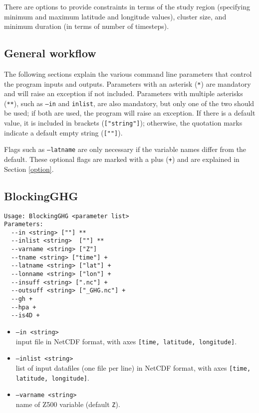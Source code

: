 \documentclass{article}
\begin{document}
There are options to provide constraints in terms of the study region (specifying minimum and maximum latitude and longitude values), cluster size, and minimum duration (in terms of number of timesteps).

\subsection{General workflow}

The following sections explain the various command line parameters that control the program inputs and outputs. Parameters with an asterisk (\texttt{*}) are mandatory and will raise an exception if not included. Parameters with multiple asterisks (\texttt{**}), such as \texttt{--in} and \texttt{inlist}, are also mandatory, but only one of the two should be used; if both are used, the program will raise an exception. If there is a default value, it is included in brackets (\texttt{["string"]}); otherwise, the quotation marks indicate a default empty string (\texttt{[""]}).

Flags such as \texttt{--latname} are only necessary if the variable names differ from the default. These optional flags are marked with a plus (\texttt{+}) and are explained in Section \ref{option}.

\subsection{BlockingGHG}\label{ghg}

\begin{verbatim}
Usage: BlockingGHG <parameter list>
Parameters:
  --in <string> [""] **
  --inlist <string>  [""] **
  --varname <string> ["Z"]
  --tname <string> ["time"] +
  --latname <string> ["lat"] +
  --lonname <string> ["lon"] +
  --insuff <string> [".nc"] +
  --outsuff <string> ["_GHG.nc"] +
  --gh +
  --hpa +
  --is4D +
\end{verbatim}

\begin{itemize}
\item[]\texttt{--in <string>} \\ input file in NetCDF format, with axes \texttt{[time, latitude, longitude]}. 
\item[]\texttt{--inlist <string>}\\ list of input datafiles (one file per line) in NetCDF format, with axes \texttt{[time, latitude, longitude]}. 
\item[] \texttt{--varname <string>}\\ name of Z500 variable (default \texttt{Z}).
\end{itemize}
\end{document}

